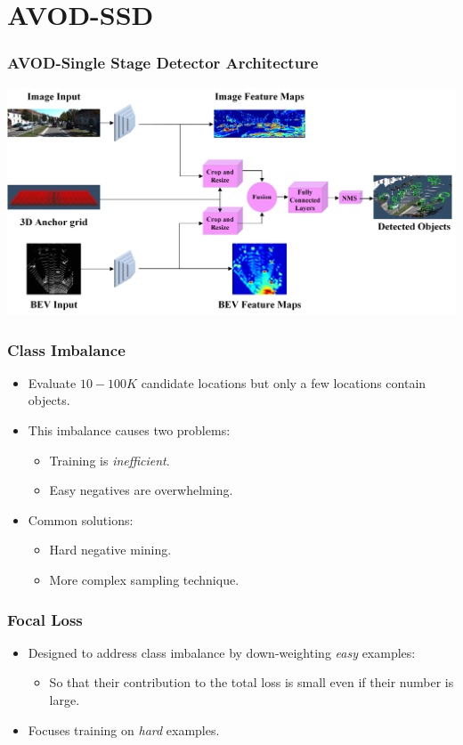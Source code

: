 \documentclass[10pt,fleqn,unknownkeysallowed]{beamer}
\begin{document}
\section{AVOD-SSD}
\begin{frame}
	\frametitle{AVOD-Single Stage Detector Architecture}
		\includegraphics[width=1.0\textwidth]{images/avod_ssd}
\end{frame}


\begin{frame}
	\frametitle{Class Imbalance}
	\linespread{1.5}
	\begin{itemize}
		\item{Evaluate $10 - 100K$ candidate locations but only a few locations contain objects.}
		\item{This imbalance causes two problems: }
		\begin{itemize}
			\item{Training is \textit{inefficient}.}
			\item{Easy negatives are overwhelming.}
		\end{itemize}
		\item{Common solutions:}
		\begin{itemize}
			\item{Hard negative mining.}
			\item{More complex sampling technique.}
		\end{itemize}
	\end{itemize}
\end{frame}


\begin{frame}
	\frametitle{Focal Loss}
	\linespread{1.5}
	\begin{itemize}
		\item{Designed to address class imbalance by down-weighting \textit{easy} examples:}
		\begin{itemize}
			\item{So that their contribution to the total loss is small even if their number is large.}
		\end{itemize}
		\item{Focuses training on \textit{hard} examples.}
	\end{itemize}
\end{frame}
\end{document}
